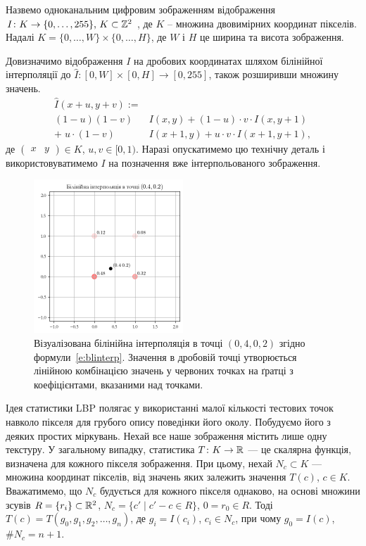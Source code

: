 Назвемо одноканальним цифровим зображенням відображення 
\(I \colon K \to \{0,\dots , 255\}$, $K \subset \Z^2\) 
, де $K$ -- множина двовимірних координат пікселів.
Надалі $K = \{0,\dots ,W\} \times \{0,\dots ,H\}$, 
де $W$ і $H$ це ширина та висота зображення.

Довизначимо відображення $I$ на дробових координатах шляхом білінійної інтерполяції до $\hat I \colon [0,W] \times [0,H] \to [0,255]$, також розширивши множину значень.
\begin{equation}\label{e:blinterp}
\begin{split}
    \hat I(x+u,y+v) := \\
    (1 - u)(1 - v) & I(x,y) + (1-u) \cdot v \cdot I(x,y+1)\\ 
    + \; u \cdot (1-v) & I(x+1,y) + u \cdot v \cdot  I(x+1,y+1),
\end{split}
\end{equation}
де $\begin{pmatrix} x & y \end{pmatrix} \in K$, $u,v \in [0,1)$. 
Наразі опускатимемо цю технічну деталь і використовуватимемо $I$ на позначення вже інтерпольованого зображення.

\begin{figure}[h]
    \centering
    \includegraphics[width=0.5\textwidth]{img/bilinear-interpolation-1.png}
    \caption{
        Візуалізована білінійна інтерполяція в точці $(0{,}4,0{,}2)$ згідно формули~\eqref{e:blinterp}. 
        Значення в дробовій точці утворюється лінійною комбінацією значень у червоних точках на ґратці
        з коефіцієнтами, вказаними над точками.
    }
    \label{fig:bilinear-interp}
\end{figure}

Ідея статистики LBP \cite{ojala2002} полягає у використанні малої кількості тестових точок навколо пікселя для грубого опису поведінки його околу.
Побудуємо його з деяких простих міркувань.
Нехай все наше зображення містить лише одну текстуру.
У загальному випадку, статистика $T \colon K \to \mathbb R$ --- це скалярна функція, визначена для кожного пікселя зображення. 
При цьому, нехай $N_c \subset K$ --- множина координат пікселів, від значень яких залежить значення $T(c)$, $c \in K$. 
Вважатимемо, що $N_c$ будується для кожного пікселя однаково, на основі множини зсувів $R = \{r_i\} \subset \mathbb R^2$, $N_c = \{c' \mid c' - c \in R\}$, $0 = r_0 \in R$.
Тоді $T(c) = T(g_0, g_1, g_2, \dots, g_n)$, де $g_i = I(c_i)$, $c_i \in N_c$, при чому $g_0 = I(c)$, $\# N_c = n+1$.

